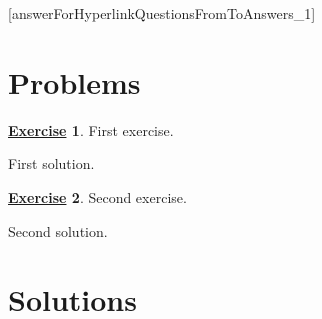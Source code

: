 \documentclass[12pt,a4paper]{article}
\theoremstyle{definition}
\newtheorem{ex}{%
		\hyperlink{ex:\theex}{Exercise}\hypertarget{sol:\theex}{}%
	}
\begin{document}
[answerForHyperlinkQuestionsFromToAnswers_1]

\section{Problems}

\begin{ex}
	First exercise.

	\begin{sol}
		First solution.
	\end{sol}
\end{ex}

\begin{ex}
	Second exercise.

	\begin{sol}
		Second solution.
	\end{sol}
\end{ex}


\newpage

\section{Solutions}


\end{document}
